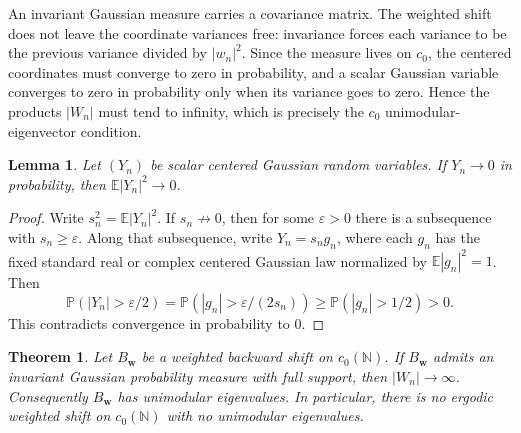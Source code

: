 \documentclass[11pt]{article}
\newtheorem{theorem}{Theorem}
\newtheorem{lemma}{Lemma}
\newcommand{\NN}{\mathbb N}
\newcommand{\EE}{\mathbb E}
\begin{document}
An invariant Gaussian measure carries a covariance matrix.  The weighted shift
does not leave the coordinate variances free: invariance forces each variance
to be the previous variance divided by \(|w_n|^2\).  Since the measure lives on
\(c_0\), the centered coordinates must converge to zero in probability, and a
scalar Gaussian variable converges to zero in probability only when its variance
goes to zero.  Hence the products \(|W_n|\) must tend to infinity, which is
precisely the \(c_0\) unimodular-eigenvector condition.

\begin{lemma}
Let \((Y_n)\) be scalar centered Gaussian random variables. If \(Y_n\to0\) in
probability, then \(\EE |Y_n|^2\to0\).
\end{lemma}

\begin{proof}
Write \(s_n^2=\EE |Y_n|^2\). If \(s_n\not\to0\), then for some \(\varepsilon>0\)
there is a subsequence with \(s_n\ge\varepsilon\). Along that subsequence,
write \(Y_n=s_n g_n\), where each \(g_n\) has the fixed standard real or
complex centered Gaussian law normalized by \(\EE |g_n|^2=1\). Then
\[
  \mathbb P(|Y_n|>\varepsilon/2)
  =\mathbb P(|g_n|>\varepsilon/(2s_n))
  \ge \mathbb P(|g_n|>1/2)>0.
\]
This contradicts convergence in probability to \(0\).
\end{proof}

\begin{theorem}
Let \(B_{\mathbf w}\) be a weighted backward shift on \(c_0(\NN)\). If
\(B_{\mathbf w}\) admits an invariant Gaussian probability measure with full
support, then \(|W_n|\to\infty\). Consequently \(B_{\mathbf w}\) has
unimodular eigenvalues. In particular, there is no ergodic weighted shift on
\(c_0(\NN)\) with no unimodular eigenvalues.
\end{theorem}
\end{document}
